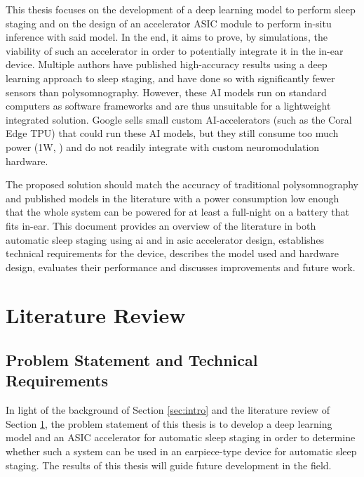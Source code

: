 \documentclass[12pt, hidelinks, draft]{article}
\begin{document}
This thesis focuses on the development of a deep learning model to perform sleep staging and on the design of an accelerator ASIC module to perform in-situ inference with said model. In the end, it aims to prove, by simulations, the viability of such an accelerator in order to
potentially integrate it in the in-ear device. Multiple authors \cite{dutt2023sleepxai, fu2021deep, eldele2021attention} have published high-accuracy results using a deep learning approach to sleep staging, and have done so with significantly fewer sensors than polysomnography.
However, these AI models run on standard computers as software frameworks and are thus unsuitable for a lightweight integrated solution. Google sells small custom AI-accelerators (such as the Coral Edge TPU) that could run these AI models, but they still consume too much
power (1W, \cite{coral_datasheet}) and do not readily integrate with custom neuromodulation hardware.

The proposed solution should match the accuracy of traditional polysomnography and published models in the literature with a power consumption low enough that the whole system can be powered for at least a full-night on a battery that fits in-ear.
This document provides an overview of the literature in both automatic sleep staging using \ac{ai} and in \ac{asic} accelerator design, establishes technical requirements for the device, describes the model used and hardware design, evaluates their performance and discusses
improvements and future work.

\newpage

\section{Literature Review}

\label{sec:lit_review}

\subsection{Problem Statement and Technical Requirements}
\label{sec:prob_statement}
In light of the background of Section \ref{sec:intro} and the literature review of Section \ref{sec:lit_review}, the problem statement of this thesis is to develop a deep
learning model and an ASIC accelerator for automatic sleep staging in order to determine whether such a system can be used in an earpiece-type device for automatic sleep staging.
The results of this thesis will guide future development in the field.
\end{document}
